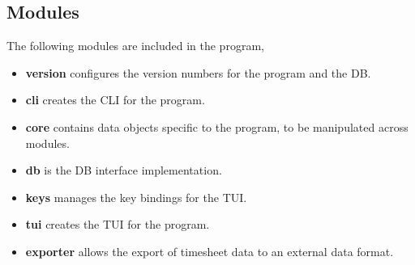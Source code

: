 \subsection{Modules}
The following modules are included in the program,
\begin{itemize}
\item \textbf{version} configures the version numbers for the program and the
  \gls{DB}.
\item \textbf{cli} creates the \gls{CLI} for the program.
\item \textbf{core} contains data objects specific to the program, to be
  manipulated across modules.
\item \textbf{db} is the \gls{DB} interface implementation.
\item \textbf{keys} manages the key bindings for the \gls{TUI}.
\item \textbf{tui} creates the \gls{TUI} for the program.
\item \textbf{exporter} allows the export of timesheet data to an external
  data format.
\end{itemize}

